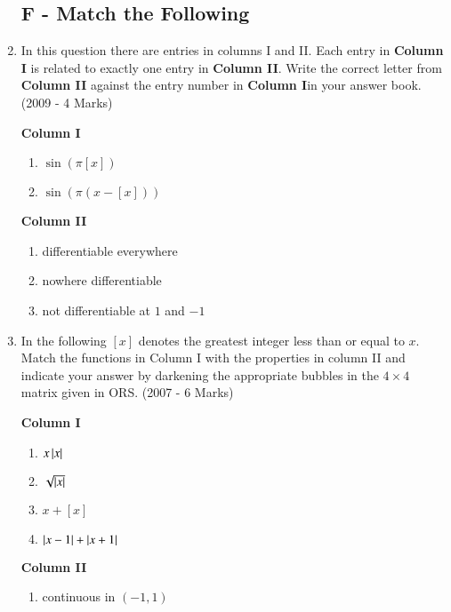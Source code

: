 \documentclass[journal,12pt,twocolumn]{IEEEtran}
\theoremstyle{remark}
\begin{document}
\begin{enumerate}
\subsection*{F - Match the Following}
		 \item In this question there are entries in columns I and II. Each entry in \textbf{Column I} is related to exactly one entry in \textbf{Column II}. Write the correct letter from \textbf{Column II} against the entry number in \textbf{Column I}in your answer book.      \hfill(2009 - 4 Marks)
			\begin{multicols}{2}
                 \textbf{Column I}
				\begin{enumerate}
					\item	$\sin{(\pi[x])}$
					\item $\sin{(\pi(x-[x]))}$
				\end{enumerate}
			\columnbreak
                 \textbf{Column II}
				\begin{enumerate}
					\item  differentiable everywhere 
						
					\item  nowhere differentiable

					\item  not differentiable at $1$ and $-1$ 
						
				\end{enumerate}
				\end{multicols}
			\item In the following $[x]$ denotes the greatest integer less than or equal to $ x$. Match the functions in Column I with the properties in column II and indicate your answer by darkening the appropriate bubbles in the $4\times4$ matrix given in ORS.
                  \hfill(2007 - 6 Marks)
			\begin{multicols}{2}
				\textbf{Column I}

				\begin{enumerate}
					\item  $x\left\vert x\right\vert$ 
					\item  $\sqrt{\left\vert x\right\vert}$ 
					\item $x+[x]$ 
					\item  $\left\vert x-1\right\vert+\left\vert x+1\right\vert$
				\end{enumerate}
			\columnbreak
				\textbf{Column II}
				\begin{enumerate}
					\item  continuous in $(-1,1)$


\end{enumerate}
\end{multicols}
\end{enumerate}
\end{document}
